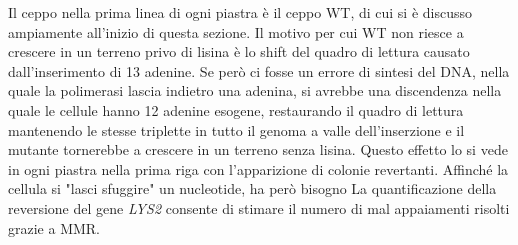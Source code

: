  Il ceppo nella prima linea di ogni piastra è il ceppo WT, di cui si è discusso ampiamente all'inizio di questa sezione. Il motivo per cui WT non riesce a crescere in un terreno privo di lisina è lo shift del quadro di lettura causato dall'inserimento di 13 adenine. Se però ci fosse un errore di sintesi del DNA, nella quale la polimerasi lascia indietro una adenina, si avrebbe una discendenza nella quale le cellule hanno 12 adenine esogene, restaurando il quadro di lettura mantenendo le stesse triplette in tutto il genoma a valle dell'inserzione e il mutante tornerebbe a crescere in un terreno senza lisina. Questo effetto lo si vede in ogni piastra nella prima riga con l'apparizione di colonie revertanti. Affinché la cellula si "lasci sfuggire" un nucleotide, ha però bisogno La quantificazione della reversione del gene \textit{LYS2} consente di stimare il numero di mal appaiamenti risolti grazie a MMR. 
